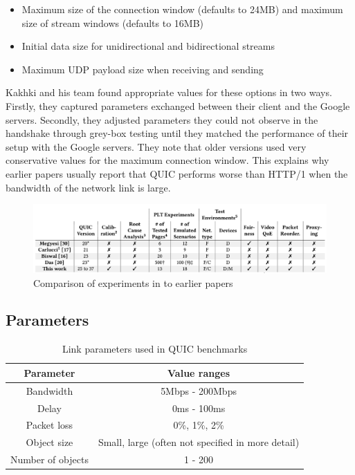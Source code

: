 \documentclass[conference]{IEEEtran}
\begin{document}
\begin{itemize}
  \item Maximum size of the connection window (defaults to 24MB) and maximum size of stream windows (defaults to 16MB)
  \item Initial data size for unidirectional and bidirectional streams
  \item Maximum UDP payload size when receiving and sending
\end{itemize}

Kakhki and his team found appropriate values for these options in two ways. Firstly, they captured parameters exchanged between their client and the Google servers. Secondly, they adjusted parameters they could not observe in the handshake through grey-box testing until they matched the performance of their setup with the Google servers. They note that older versions used very conservative values for the maximum connection window. This explains why earlier papers usually report that QUIC performs worse than HTTP/1 when the bandwidth of the network link is large.

\begin{figure}[t]
\centerline{\includegraphics[width=\textwidth]{images/Kakhki overview.png}}
\caption{Comparison of experiments in \cite{Kakhki} to earlier papers}
\label{fig:Kakhki Comparison}
\end{figure}

\subsection{Parameters}

\begin{table}
\begin{center}
\begin{tabular}{|c|c|}
\hline
\textbf{Parameter} & \textbf{Value ranges} \\
\hline
Bandwidth & 5Mbps - 200Mbps\\
Delay & 0ms - 100ms \\
Packet loss & 0\%, 1\%, 2\% \\
Object size & Small, large (often not specified in more detail) \\
Number of objects & 1 - 200 \\
\hline
\end{tabular}
\end{center}
\caption{Link parameters used in QUIC benchmarks}
\label{fig:quic-parameters}
\end{table}
\end{document}
